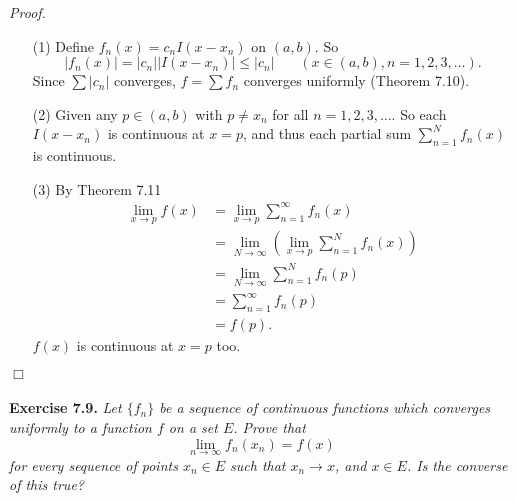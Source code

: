 \documentclass{article}
\begin{document}
\emph{Proof.}
\begin{enumerate}
\item[(1)]
Define $f_n(x) = c_n I(x-x_n)$ on $(a,b)$. So
\[
  |f_n(x)| = |c_n| |I(x-x_n)| \leq |c_n|
  \:\:\:\:\:\:\:\:
  (x \in (a,b), n = 1,2,3,\ldots).
\]
Since $\sum|c_n|$ converges, $f = \sum f_n$ converges uniformly (Theorem 7.10).

\item[(2)]
Given any $p \in (a,b)$ with $p \neq x_n$ for all $n=1,2,3,\ldots$.
So each $I(x-x_n)$ is continuous at $x=p$, and thus
each partial sum $\sum_{n=1}^{N} f_n(x)$ is continuous.

\item[(3)]
By Theorem 7.11
\begin{align*}
  \lim_{x \to p} f(x)
  &= \lim_{x \to p} \sum_{n=1}^{\infty} f_n(x) \\
  &= \lim_{N \to \infty} \left( \lim_{x \to p} \sum_{n=1}^{N} f_n(x) \right) \\
  &= \lim_{N \to \infty} \sum_{n=1}^{N} f_n(p) \\
  &= \sum_{n=1}^{\infty} f_n(p) \\
  &= f(p).
\end{align*}
$f(x)$ is continuous at $x=p$ too.
\end{enumerate}
$\Box$ \\\\






\textbf{Exercise 7.9.}
\emph{Let $\{f_n\}$ be a sequence of continuous functions
which converges uniformly to a function $f$ on a set $E$.
Prove that
\[
  \lim_{n \to \infty} f_n(x_n) = f(x)
\]
for every sequence of points $x_n \in E$ such that $x_n \to x$,
and $x \in E$.
Is the converse of this true?} \\
\end{document}
